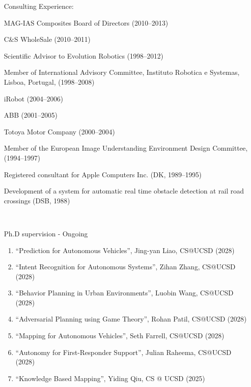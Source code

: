 \documentclass{article}
\newenvironment{sublist}{%
  \begin{list}{}{%
      \setlength{\itemsep}{0em}\setlength{\parsep}{0em}%
      \setlength{\topsep}{0em}\setlength{\parskip}{0em}%
    }%
}%
{ \end{list} }
\begin{document}
\begin{cv}
\begin{cvlist}{Consulting Experience:}
\begin{sublist}
			\item MAG-IAS Composites Board of Directors (2010--2013)
			\item C\&S WholeSale (2010--2011)
			\item Scientific Advisor to Evolution Robotics (1998--2012)
			\item Member of International Advisory Committee, Instituto Robotica e Systemas, Lisboa, Portugal, (1998--2008)
			\item iRobot (2004--2006)
			\item ABB (2001--2005)
			\item Totoya Motor Company (2000--2004)
			\item Member of the European Image Understanding Environment Design	Committee, (1994--1997)
			\item Registered consultant for Apple Computers Inc. (DK, 1989--1995)
			\item Development of a system for automatic real time obstacle	detection at rail road crossings (DSB, 1988)
		\end{sublist}
	\end{cvlist}



	\begin{cvlist}{~}

		\item[Ph.D supervision - Ongoing]\ \\
		\begin{enumerate}
			\item ``Prediction for Autonomous Vehicles'', Jing-yan Liao, CS@UCSD (2028)
			\item ``Intent Recognition for Autonomous Systems'', Zihan Zhang, CS@UCSD (2028)
			\item ``Behavior Planning in Urban Environments'', Luobin Wang, CS@UCSD (2028)
			\item ``Adversarial Planning using Game Theory'', Rohan Patil, CS@UCSD (2028)
			\item ``Mapping for Autonomous Vehicles'', Seth Farrell, CS@UCSD (2028)
			\item ``Autonomy for First-Responder Support'', Julian Raheema, CS@UCSD (2028)
			\item ``Knowledge Based Mapping'', Yiding Qiu, CS @ UCSD (2025)
		\end{enumerate}


\end{cvlist}
\end{cv}
\end{document}
